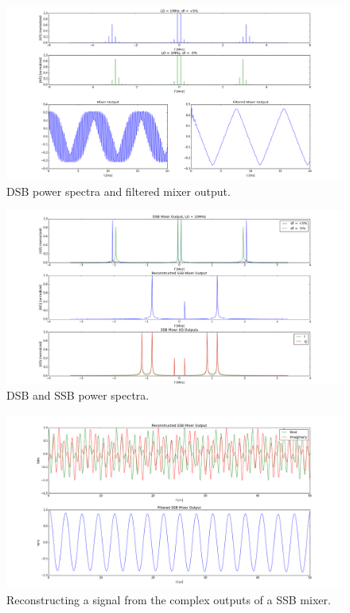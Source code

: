 \documentclass[11pt]{article}
\begin{document}
    \begin{figure}[H]
        \centering
            \includegraphics[width = \textwidth]{2_1_2_filtering.png}
        \caption{DSB power spectra and filtered mixer output.}
        \label{dsbfilt}
    \end{figure}
    
    

    \begin{figure}[H]
        \centering
            \includegraphics[width = \textwidth]{2_2_2_dsb_ssb_freq.png}
        \caption{DSB and SSB power spectra.}
        \label{sbfreq}
    \end{figure}

    \begin{figure}[H]
        \centering
            \includegraphics[width = \textwidth]{2_2_2_ssb_time.png}
        \caption{Reconstructing a signal from the complex outputs of a SSB mixer.}
        \label{ssbtime}
    \end{figure}
\end{document}

